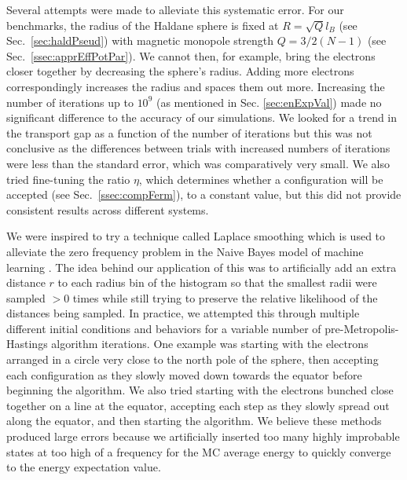     Several attempts were made to alleviate this systematic error. For our benchmarks, the radius of the Haldane sphere is fixed at $R=\sqrt{Q}l_B$ (see Sec.~\ref{sec:haldPseud}) with magnetic monopole strength $Q=3/2(N-1)$ (see Sec.~\ref{ssec:apprEffPotPar}). We cannot then, for example, bring the electrons closer together by decreasing the sphere's radius. Adding more electrons correspondingly increases the radius and spaces them out more. Increasing the number of iterations up to $10^9$ (as mentioned in Sec. \ref{sec:enExpVal}) made no significant difference to the accuracy of our simulations. We looked for a trend in the transport gap as a function of the number of iterations but this was not conclusive as the differences between trials with increased numbers of iterations were less than the standard error, which was comparatively very small. We also tried fine-tuning the ratio $\eta$, which determines whether a configuration will be accepted (see Sec.~\ref{ssec:compFerm}), to a constant value, but this did not provide consistent results across different systems. 
    
    We were inspired to try a technique called Laplace smoothing which is used to alleviate the zero frequency problem in the Naive Bayes model of machine learning \cite{kikuchi}. The idea behind our application of this was to artificially add an extra distance $r$ to each radius bin of the histogram so that the smallest radii were sampled $>0$ times while still trying to preserve the relative likelihood of the distances being sampled. In practice, we attempted this through multiple different initial conditions and behaviors for a variable number of pre-Metropolis-Hastings algorithm iterations. One example was starting with the electrons arranged in a circle very close to the north pole of the sphere, then accepting each configuration as they slowly moved down towards the equator before beginning the algorithm. We also tried starting with the electrons bunched close together on a line at the equator, accepting each step as they slowly spread out along the equator, and then starting the algorithm. We believe these methods produced large errors because we artificially inserted too many highly improbable states at too high of a frequency for the MC average energy to quickly converge to the energy expectation value.
    
